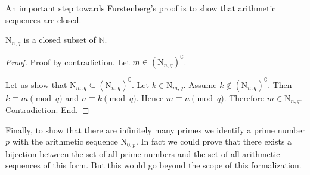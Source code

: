 \documentclass{article}
\newcommand{\N}{\mathrm{N}}
\begin{document}
  An important step towards Furstenberg's proof is to show that arithmetic
  sequences are closed.

  \begin{forthel}
    \begin{lemma}
      $\N_{n, q}$ is a closed subset of $\mathbb{N}$.
    \end{lemma}
    \begin{proof}
      Proof by contradiction.
      Let $m \in (\N_{n, q})^{\complement}$.

      Let us show that $\N_{m, q} \subseteq (\N_{n, q})^{\complement}$.
        Let $k \in \N_{m, q}$.
        Assume $k \notin (\N_{n, q})^{\complement}$.
        Then $k \equiv m \pmod{q}$ and $n \equiv k \pmod{q}$.
        Hence $m \equiv n \pmod{q}$.
        Therefore $m \in \N_{n, q}$.
        Contradiction.
      End.
    \end{proof}
  \end{forthel}

  Finally, to show that there are infinitely many primes we identify a prime
  number $p$ with the arithmetic sequence $\N_{0, p}$.
  In fact we could prove that there exists a bijection between the set of all
  prime numbers and the set of all arithmetic sequences of this form.
  But this would go beyond the scope of this formalization.
\end{document}
